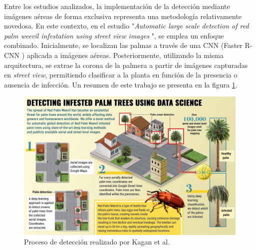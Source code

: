 Entre los estudios analizados, la implementación de la detección mediante imágenes aéreas de forma exclusiva representa una metodología relativamente novedosa. En este contexto, en el estudio "\textit{Automatic large scale detection of red palm weevil infestation using street view images} \citep{kagan_automatic_2021}", se emplea un enfoque combinado. Inicialmente, se localizan las palmas a través de una CNN (Faster R-CNN \citep{ren_faster_2016}) aplicada a imágenes aéreas. Posteriormente, utilizando la misma arquitectura, se extrae la corona de la palmera a partir de imágenes capturadas en \textit{street view}, permitiendo clasificar a la planta en función de la presencia o ausencia de infección. Un resumen de este trabajo se presenta en la figura \ref{fig:kagan-automatic-2021-process}.

\begin{figure}[htpb]
  \centering
  \includegraphics[scale=1.8]{./Figures/kagan_automatic_2021-process.jpg}
  \caption{Proceso de detección realizado por Kagan et al\protect\footnotemark.}
  \label{fig:kagan-automatic-2021-process}
\end{figure}


